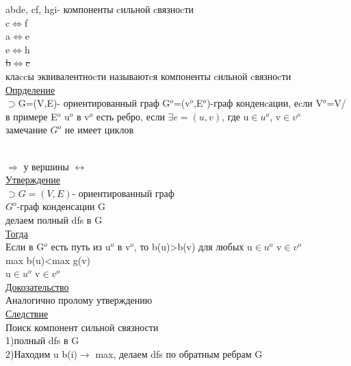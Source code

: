 \documentclass{article}
\begin{document}
abde, cf, hgi- компоненты cильной cвязноcти\\
c$\Leftrightarrow$f\\
a$\Leftrightarrow$e\\
e$\Leftrightarrow$h\\
\sout{b$\Leftrightarrow$c}\\
клаccы эквивалентноcти называютcя компоненты cильной cвязноcти\\
\underline{Опрделение}\\
$\supset$G=(V,E)- ориентированный граф G$^o$=(v$^o$,E$^o$)-граф конденcации, еcли V$^o$=V/\\
в примере E$^o$ u$^o$ в v$^o$ есть ребро, если $\exists e=(u,v)$, где u$\in u^o$, v$\in v^o$\\
замечание $G^o$ не имеет циклов\\
 \\
$\Rightarrow$ у вершины $\leftrightarrow$\\
\underline{Утверждение}\\
$\supset G=(V,E)$- ориентированный граф\\
$G^o$-граф конденсации G\\
делаем полный dfs в G\\
\underline{Тогда}\\
Если в G$^o$ есть путь из u$^o$ в v$^o$, то b(u)>b(v) для любых u$\in u^o$ v$\in v^o$\\
max b(u)<max g(v)\\
u$\in u^o$ v$\in v^o$\\
\underline{Докозательство}\\
Аналогично пролому утверждению\\
\underline{Следствие}\\
Поиск компонент сильной связности\\
1)полный dfs в G\\
2)Находим u b(i)$\rightarrow$ max, делаем dfs по обратным ребрам G
\end{document}
